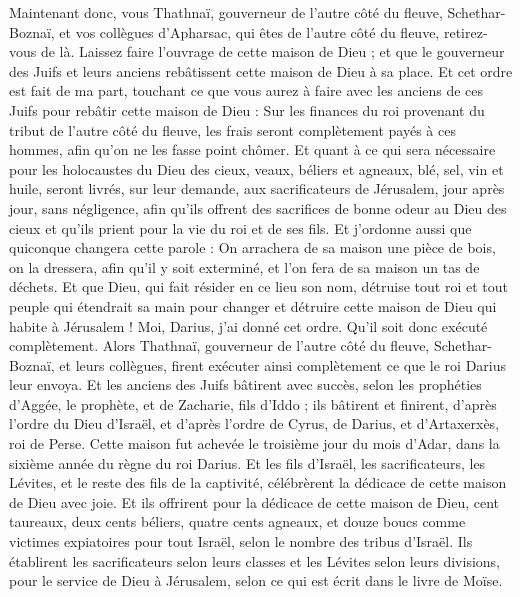 \begin{multicols}{2}
Maintenant donc, vous Thathnaï, gouverneur de l'autre côté du fleuve, Schethar-Boznaï, et vos collègues d'Apharsac, qui êtes de l'autre côté du fleuve, retirez-vous de là.
Laissez faire l'ouvrage de cette maison de Dieu ; et que le gouverneur des Juifs et leurs anciens rebâtissent cette maison de Dieu à sa place.
Et cet ordre est fait de ma part, touchant ce que vous aurez à faire avec les anciens de ces Juifs pour rebâtir cette maison de Dieu : Sur les finances du roi provenant du tribut de l’autre côté du fleuve, les frais seront complètement payés à ces hommes, afin qu’on ne les fasse point chômer.
Et quant à ce qui sera nécessaire pour les holocaustes du Dieu des cieux, veaux, béliers et agneaux, blé, sel, vin et huile, seront livrés, sur leur demande, aux sacrificateurs de Jérusalem, jour après jour, sans négligence,
afin qu'ils offrent des sacrifices de bonne odeur au Dieu des cieux et qu'ils prient pour la vie du roi et de ses fils.
Et j'ordonne aussi que quiconque changera cette parole : On arrachera de sa maison une pièce de bois, on la dressera, afin qu'il y soit exterminé, et l’on fera de sa maison un tas de déchets.
Et que Dieu, qui fait résider en ce lieu son nom, détruise tout roi et tout peuple qui étendrait sa main pour changer et détruire cette maison de Dieu qui habite à Jérusalem ! Moi, Darius, j’ai donné cet ordre. Qu'il soit donc exécuté complètement.
Alors Thathnaï, gouverneur de l'autre côté du fleuve, Schethar-Boznaï, et leurs collègues, firent exécuter ainsi complètement ce que le roi Darius leur envoya.
Et les anciens des Juifs bâtirent avec succès, selon les prophéties d'Aggée, le prophète, et de Zacharie, fils d’Iddo ; ils bâtirent et finirent, d'après l'ordre du Dieu d'Israël, et d'après l'ordre de Cyrus, de Darius, et d'Artaxerxès, roi de Perse.
Cette maison fut achevée le troisième jour du mois d'Adar, dans la sixième année du règne du roi Darius.
Et les fils d'Israël, les sacrificateurs, les Lévites, et le reste des fils de la captivité, célébrèrent la dédicace de cette maison de Dieu avec joie.
Et ils offrirent pour la dédicace de cette maison de Dieu, cent taureaux, deux cents béliers, quatre cents agneaux, et douze boucs comme victimes expiatoires pour tout Israël, selon le nombre des tribus d'Israël.
Ils établirent les sacrificateurs selon leurs classes et les Lévites selon leurs divisions, pour le service de Dieu à Jérusalem,  selon ce qui est écrit dans le livre de Moïse.

\end{multicols}
